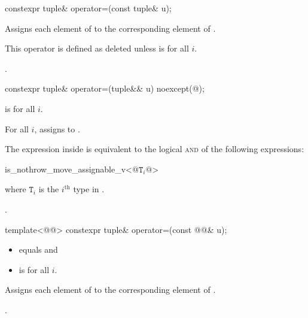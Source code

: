 \documentclass{wg21}
\begin{document}
%
\begin{itemdecl}
    constexpr tuple& operator=(const tuple& u);
\end{itemdecl}

\begin{itemdescr}
    \pnum
    \effects
    Assigns each element of  to the corresponding
    element of .

    \pnum
    \remarks
    This operator is defined as deleted unless
     is  for all $i$.

    \pnum
    \returns
    .
\end{itemdescr}

%
\begin{itemdecl}
    constexpr tuple& operator=(tuple&& u) noexcept(@\seebelow@);
\end{itemdecl}

\begin{itemdescr}
    \pnum
    \constraints
     is  for all $i$.

    \pnum
    \effects
    For all $i$, assigns  to
    .

    \pnum
    \remarks
    The expression inside  is equivalent to the logical \textsc{and} of the
    following expressions:

    \begin{codeblock}
        is_nothrow_move_assignable_v<@$\mathtt{T}_i$@>
    \end{codeblock}
    where $\mathtt{T}_i$ is the $i^\text{th}$ type in .

    \pnum
    \returns
    .
\end{itemdescr}

%
\begin{itemdecl}
    template<@@>
    constexpr tuple& operator=(const @@& u);
\end{itemdecl}

\begin{itemdescr}
    \pnum
    \constraints
    \begin{itemize}
        \item {} equals  and
        \item {} is  for all $i$.
    \end{itemize}

    \pnum
    \effects
    Assigns each element of  to the corresponding element
    of .

    \pnum
    \returns
    .
\end{itemdescr}
\end{document}
